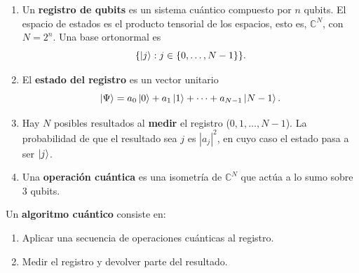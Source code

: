 \documentclass[11pt,compress]{beamer}
\begin{document}
\begin{frame}
  
  \begin{definition}
    \fontsize{10}{5}\selectfont
    \begin{enumerate}
  	  \item Un \textbf{registro de qubits} es un sistema cuántico compuesto por $n$ qubits. El espacio de estados es el producto tensorial de los espacios, esto es, $\mathbb{C}^{N}$, con $N = 2^n$. Una base ortonormal es 
  	  \vspace{-3mm}
  	  \[\{\ket{j} : j \in \{0, \ldots, N-1\}\}.\] 
  	  \vspace{-5mm}
  	  \item El \textbf{estado del registro} es un vector unitario
  	  \vspace{-3mm}
  	  \[\ket{\Psi} = a_0 \ket{0} + a_1 \ket{1} + \cdots + a_{N-1} \ket{N-1}.\]
  	  \vspace{-5mm}
      \item Hay $N$ posibles resultados al \textbf{medir} el registro ($0, 1, \ldots, N-1$). La probabilidad de que el resultado sea $j$ es $|a_j|^2$, en cuyo caso el estado pasa a ser $\ket{j}$.
      \vspace{-2mm}
      \item Una \textbf{operación cuántica} es una isometría de $\mathbb{C}^N$ que actúa a lo sumo sobre $3$ qubits.
  	\end{enumerate}
  \end{definition}
  
  \begin{tcolorbox}[colback=ChetwodeBlue!10,colframe=ChetwodeBlue!60]
    \fontsize{10}{5}\selectfont
  Un \textbf{algoritmo cuántico} consiste en:
  \begin{enumerate}
  	 \item Aplicar una secuencia de operaciones cuánticas al registro.
  	 \item Medir el registro y devolver parte del resultado.
  \end{enumerate} 
  \end{tcolorbox}
\end{frame}
\end{document}
